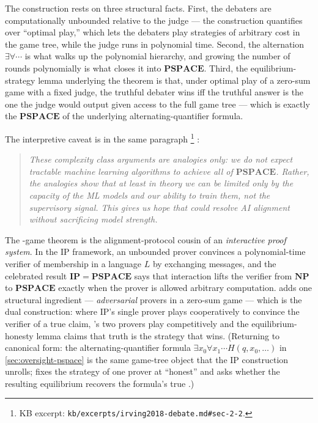 The construction rests on three structural facts. First, the
debaters are computationally unbounded relative to the judge --- the
construction quantifies over ``optimal play,'' which lets the debaters
play strategies of arbitrary cost in the game tree, while the judge
runs in polynomial time. Second, the alternation $\exists \forall
\cdots$ is what walks up the polynomial hierarchy, and growing the
number of rounds polynomially is what closes it into $\mathbf{PSPACE}$.
Third, the equilibrium-strategy lemma underlying the theorem is that,
under optimal play of a zero-sum game with a fixed judge, the truthful
debater wins iff the truthful answer is the one the judge would output
given access to the full game tree --- which is exactly the
$\mathbf{PSPACE}$  of the underlying alternating-quantifier
formula.

The interpretive caveat is in the same paragraph%
\footnote{KB excerpt: \nolinkurl{kb/excerpts/irving2018-debate.md#sec-2-2}.}
\citep[\S 2.2]{irving2018-debate}:

\begin{quote}\itshape
These complexity class arguments are analogies only: we do not expect
tractable machine learning algorithms to achieve all of $\mathbf{PSPACE}$.
Rather, the analogies show that at least in theory we can be limited
only by the capacity of the ML models and our ability to train them,
not the supervisory signal. This gives us hope that  could
resolve AI alignment without sacrificing model strength.
\end{quote}

\begin{analogy}
The -game theorem is the alignment-protocol cousin of an
\emph{interactive proof system}. In the IP framework, an unbounded
prover convinces a polynomial-time verifier of membership in a
language $L$ by exchanging messages, and the celebrated result
$\mathbf{IP} = \mathbf{PSPACE}$  says that interaction lifts the verifier from
$\mathbf{NP}$ to $\mathbf{PSPACE}$ exactly when the prover is allowed
arbitrary computation.  adds one structural ingredient ---
\emph{adversarial} provers in a zero-sum game --- which is the dual
construction: where IP's single prover plays cooperatively to convince
the verifier of a true claim, 's two provers play competitively
and the equilibrium-honesty lemma claims that truth is the strategy
that wins. (Returning to canonical form: the alternating-quantifier
formula $\exists x_0 \forall x_1 \cdots H(q, x_0, \ldots)$ in
\cref{sec:oversight-pspace} is the same game-tree object that the IP
construction unrolls;  fixes the strategy of one prover at
``honest'' and asks whether the resulting equilibrium recovers the %
formula's true .)
\end{analogy}

